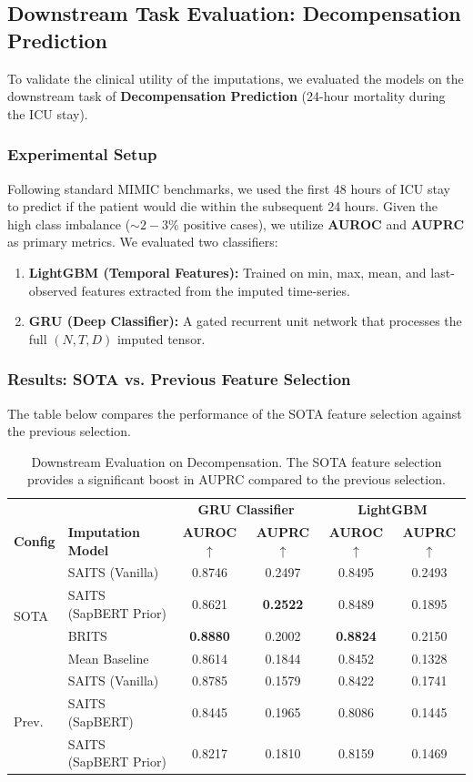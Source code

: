 \subsection{Downstream Task Evaluation: Decompensation Prediction}
To validate the clinical utility of the imputations, we evaluated the models on the downstream task of \textbf{Decompensation Prediction} (24-hour mortality during the ICU stay). 

\subsubsection{Experimental Setup}
Following standard MIMIC benchmarks, we used the first 48 hours of ICU stay to predict if the patient would die within the subsequent 24 hours. Given the high class imbalance ($\sim 2-3\%$ positive cases), we utilize \textbf{AUROC} and \textbf{AUPRC} as primary metrics. We evaluated two classifiers:
\begin{enumerate}
    \item \textbf{LightGBM (Temporal Features):} Trained on min, max, mean, and last-observed features extracted from the imputed time-series.
    \item \textbf{GRU (Deep Classifier):} A gated recurrent unit network that processes the full $(N, T, D)$ imputed tensor.
\end{enumerate}

\subsubsection{Results: SOTA vs. Previous Feature Selection}
The table below compares the performance of the SOTA feature selection against the previous selection.

\begin{table}[h]
\centering
\begin{tabular}{llcc|cc}
\toprule
 & & \multicolumn{2}{c}{\textbf{GRU Classifier}} & \multicolumn{2}{c}{\textbf{LightGBM}} \\
\textbf{Config} & \textbf{Imputation Model} & \textbf{AUROC} $\uparrow$ & \textbf{AUPRC} $\uparrow$ & \textbf{AUROC} $\uparrow$ & \textbf{AUPRC} $\uparrow$ \\
\midrule
\multirow{4}{*}{SOTA} & SAITS (Vanilla) & 0.8746 & 0.2497 & 0.8495 & 0.2493 \\
 & SAITS (SapBERT Prior) & 0.8621 & \textbf{0.2522} & 0.8489 & 0.1895 \\
 & BRITS & \textbf{0.8880} & 0.2002 & \textbf{0.8824} & 0.2150 \\
 & Mean Baseline & 0.8614 & 0.1844 & 0.8452 & 0.1328 \\
\midrule
\multirow{3}{*}{Prev.} & SAITS (Vanilla) & 0.8785 & 0.1579 & 0.8422 & 0.1741 \\
 & SAITS (SapBERT) & 0.8445 & 0.1965 & 0.8086 & 0.1445 \\
 & SAITS (SapBERT Prior) & 0.8217 & 0.1810 & 0.8159 & 0.1469 \\
\bottomrule
\end{tabular}
\caption{Downstream Evaluation on Decompensation. The SOTA feature selection provides a significant boost in AUPRC compared to the previous selection.}
\label{tab:downstream}
\end{table}

